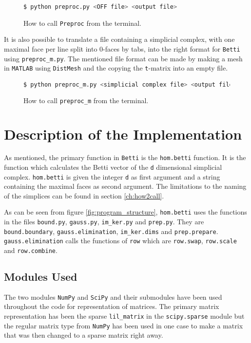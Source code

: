 \documentclass[11pt,a4paper,twoside]{report}
\begin{document}
\begin{figure}[H]
\begin{lstlisting}[language=bash]
$ python preproc.py <OFF file> <output file> 
\end{lstlisting}
\caption{How to call \texttt{Preproc} from the terminal.}
\label{fig:preproc}
\end{figure}

It is also possible to translate a file containing a simplicial complex, with one maximal face per line split into 0-faces by tabs, into the right format for \texttt{Betti} using \texttt{preproc\_m.py}. The mentioned file format can be made by making a mesh in \texttt{MATLAB} using \texttt{DistMesh} and the copying the \texttt{t}-matrix into an empty file.

\begin{figure}[H]
\begin{lstlisting}[language=bash]
$ python preproc_m.py <simplicial complex file> <output file> 
\end{lstlisting}
\caption{How to call \texttt{preproc\_m} from the terminal.}
\label{fig:preproc_m}
\end{figure}

\section{Description of the Implementation}
As mentioned, the primary function in \texttt{Betti} is the \texttt{hom.betti} function. It is the function which calculates the Betti vector of the \texttt{d} dimensional simplicial complex. \texttt{hom.betti} is given the integer \texttt{d} as first argument and a string containing the maximal faces as second argument. The limitations to the naming of the simplices can be found in section \ref{ch:how2call}. 

As can be seen from figure \ref{fig:program_structure}, \texttt{hom.betti} uses the functions in the files \texttt{bound.py}, \texttt{gauss.py}, \texttt{im\_ker.py} and \texttt{prep.py}. They are \texttt{bound.boundary}, \texttt{gauss.elimination}, \texttt{im\_ker.dims} and \texttt{prep.prepare}. \texttt{gauss.elimination} calls the functions of \texttt{row} which are \texttt{row.swap}, \texttt{row.scale} and \texttt{row.combine}.

\subsection{Modules Used}
The two modules \texttt{NumPy} and \texttt{SciPy} and their submodules have been used throughout the code for representation of matrices. The primary matrix representation has been the sparse \texttt{lil\_matrix} in the \texttt{scipy.sparse} module but the regular matrix type from \texttt{NumPy} has been used in one case to make a matrix that was then changed to a sparse matrix right away. 
\end{document}

